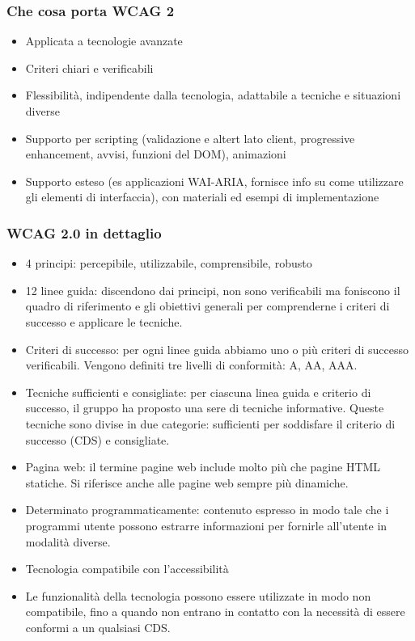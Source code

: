\documentclass{article}
\begin{document}
\subsubsection{Che cosa porta WCAG 2}
\begin{itemize}
	\item Applicata a tecnologie avanzate
	\item Criteri chiari e verificabili
	\item Flessibilità, indipendente dalla tecnologia, adattabile a tecniche e situazioni diverse
	\item Supporto per scripting (validazione e altert lato client, progressive enhancement, avvisi, funzioni del DOM), animazioni
	\item Supporto esteso (es applicazioni WAI-ARIA, fornisce info su come utilizzare gli elementi di interfaccia), con materiali ed esempi di implementazione
\end{itemize}
\subsubsection{WCAG 2.0 in dettaglio}
\begin{itemize}
	\item 4 principi: percepibile, utilizzabile, comprensibile, robusto
	\item 12 linee guida: discendono dai principi, non sono verificabili ma foniscono il quadro di riferimento e gli obiettivi generali per comprenderne i criteri di successo e applicare le tecniche.
	\item Criteri di successo: per ogni linee guida abbiamo uno o più criteri di successo verificabili. Vengono definiti tre livelli di conformità: A, AA, AAA.
	\item Tecniche sufficienti e consigliate: per ciascuna linea guida e criterio di successo, il gruppo ha proposto una sere di tecniche informative. Queste tecniche sono divise in due categorie: sufficienti per soddisfare il criterio di successo (CDS) e consigliate.
	\item Pagina web: il termine pagine web include molto più che pagine HTML statiche. Si riferisce anche alle pagine web sempre più dinamiche.
	\item Determinato programmaticamente: contenuto espresso in modo tale che i programmi utente possono estrarre informazioni per fornirle all'utente in modalità diverse.
	\item Tecnologia compatibile con l'accessibilità
	\item Le funzionalità della tecnologia possono essere utilizzate in modo non compatibile, fino a quando non entrano in contatto con la necessità di essere conformi a un qualsiasi CDS.
\end{itemize}
\end{document}
